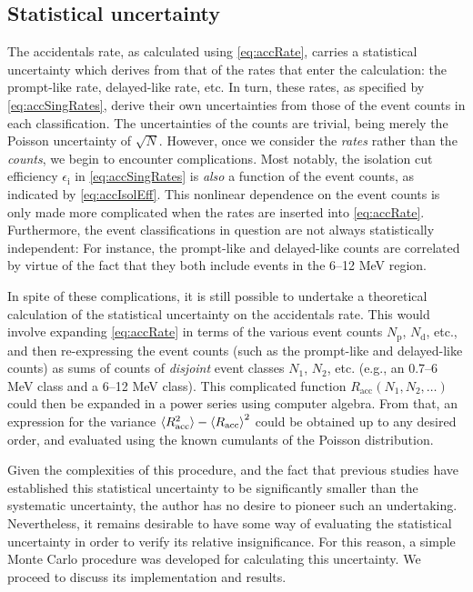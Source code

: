 \documentclass[../thesis.tex]{subfiles}
\begin{document}
\subsection{Statistical uncertainty}
\label{sec:accStatUnc}

The accidentals rate, as calculated using \autoref{eq:accRate}, carries a statistical uncertainty which derives from that of the rates that enter the calculation: the prompt-like rate, delayed-like rate, etc. In turn, these rates, as specified by \autoref{eq:accSingRates}, derive their own uncertainties from those of the event counts in each classification. The uncertainties of the counts are trivial, being merely the Poisson uncertainty of $\sqrt{N}$. However, once we consider the \emph{rates} rather than the \emph{counts}, we begin to encounter complications. Most notably, the isolation cut efficiency $\epsilon_{\mathrm{i}}$ in \autoref{eq:accSingRates} is \emph{also} a function of the event counts, as indicated by \autoref{eq:accIsolEff}. This nonlinear dependence on the event counts is only made more complicated when the rates are inserted into \autoref{eq:accRate}. Furthermore, the event classifications in question are not always statistically independent: For instance, the prompt-like and delayed-like counts are correlated by virtue of the fact that they both include events in the 6--12 MeV region.

In spite of these complications, it is still possible to undertake a theoretical calculation of the statistical uncertainty on the accidentals rate. This would involve expanding \autoref{eq:accRate} in terms of the various event counts $N_{\mathrm{p}}$, $N_{\mathrm{d}}$, etc., and then re-expressing the event counts (such as the prompt-like and delayed-like counts) as sums of counts of \emph{disjoint} event classes $N_1$, $N_2$, etc. (e.g., an 0.7--6 MeV class and a 6--12 MeV class). This complicated function $R_{\mathrm{acc}}(N_1, N_2, \ldots)$ could then be expanded in a power series using computer algebra. From that, an expression for the variance $\braket{R_{\mathrm{acc}}^2} - \braket{R_{\mathrm{acc}}}^2$ could be obtained up to any desired order, and evaluated using the known cumulants of the Poisson distribution.

Given the complexities of this procedure, and the fact that previous studies have established this statistical uncertainty to be significantly smaller than the systematic uncertainty, the author has no desire to pioneer such an undertaking. Nevertheless, it remains desirable to have some way of evaluating the statistical uncertainty in order to verify its relative insignificance.
For this reason, a simple Monte Carlo procedure was developed for calculating this uncertainty. We proceed to discuss its implementation and results.
\end{document}
